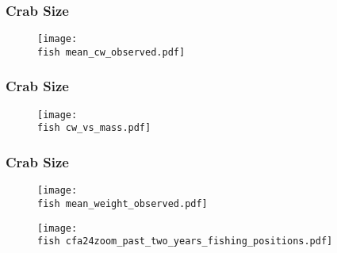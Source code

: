 \documentclass{beamer}
\begin{document}
	
	\begin{frame}
		\frametitle{Crab Size}
		\begin{figure}
			
			\vspace*{-.5cm}
			\centerline{\texttt{[image: \\fish mean\_cw\_observed.pdf]}}
			
		\end{figure}
	\end{frame}
	
	
	\begin{frame}
		\frametitle{Crab Size}
		\begin{figure}
			
			\vspace*{-.5cm}
			\centerline{\texttt{[image: \\fish cw\_vs\_mass.pdf]}}
			
		\end{figure}
	\end{frame}
	
	
	\begin{frame}
		\frametitle{Crab Size}
		\begin{figure}
			
			\vspace*{-.5cm}
			\centerline{\texttt{[image: \\fish mean\_weight\_observed.pdf]}}
			
		\end{figure}
	\end{frame}
	
	
	\begin{frame}
		\begin{figure}
			
			\vspace*{-.3cm}
			\centerline{\texttt{[image: \\fish cfa24zoom\_past\_two\_years\_fishing\_positions.pdf]}}
			
		\end{figure}
	\end{frame}
	
\end{document}
